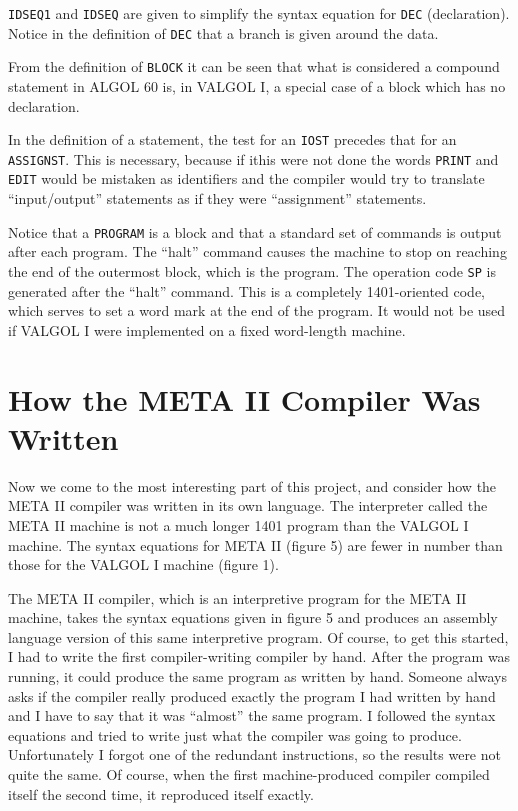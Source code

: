 \documentclass[notitlepage,twocolumn]{report}
\begin{document}
\texttt{IDSEQ1} and \texttt{IDSEQ} are given to simplify the syntax
equation for \texttt{DEC} (declaration). Notice in the definition of
\texttt{DEC} that a branch is given around the data.

From the definition of \texttt{BLOCK} it can be seen that what is
considered a compound statement in ALGOL 60 is, in VALGOL I, a special
case of a block which has no declaration.

In the definition of a statement, the test for an \texttt{IOST}
precedes that for an \texttt{ASSIGNST}. This is necessary, because if
ithis were not done the words \texttt{PRINT} and \texttt{EDIT} would
be mistaken as identifiers and the compiler would try to translate
``input/output'' statements as if they were ``assignment'' statements.

Notice that a \texttt{PROGRAM} is a block and that a standard set of
commands is output after each program. The ``halt'' command causes the
machine to stop on reaching the end of the outermost block, which is
the program. The operation code \texttt{SP} is generated after the
``halt'' command. This is a completely 1401-oriented code, which
serves to set a word mark at the end of the program. It would not be
used if VALGOL I were implemented on a fixed word-length machine.


\section*{How the META II Compiler Was Written}

Now we come to the most interesting part of this project, and consider
how the META II compiler was written in its own language. The
interpreter called the META II machine is not a much longer 1401
program than the VALGOL I machine. The syntax equations for META II
(figure 5) are fewer in number than those for the VALGOL I machine
(figure 1).

The META II compiler, which is an interpretive program for the META II
machine, takes the syntax equations given in figure 5 and produces an
assembly language version of this same interpretive program. Of
course, to get this started, I had to write the first compiler-writing
compiler by hand. After the program was running, it could produce the
same program as written by hand. Someone always asks if the compiler
really produced exactly the program I had written by hand and I have
to say that it was ``almost'' the same program. I followed the syntax
equations and tried to write just what the compiler was going to
produce. Unfortunately I forgot one of the redundant instructions, so
the results were not quite the same. Of course, when the first
machine-produced compiler compiled itself the second time, it
reproduced itself exactly.
\end{document}
